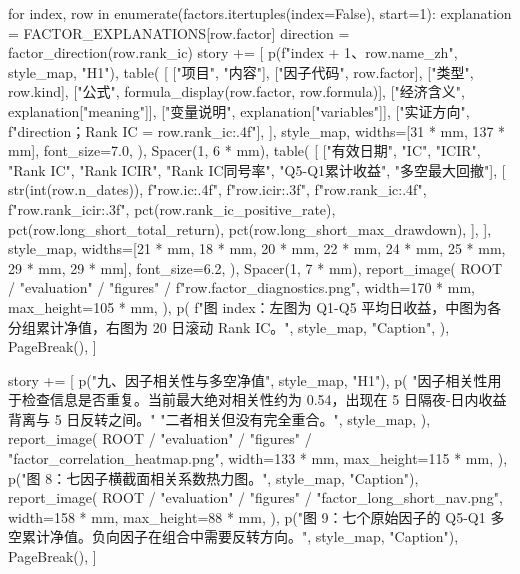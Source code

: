 \documentclass[UTF8,a4paper,fontset=fandol]{ctexart}
\begin{document}
\begin{ProjectCode}
    for index, row in enumerate(factors.itertuples(index=False), start=1):
        explanation = FACTOR_EXPLANATIONS[row.factor]
        direction = factor_direction(row.rank_ic)
        story += [
            p(f"{index + 1}、{row.name_zh}", style_map, "H1"),
            table(
                [
                    ["项目", "内容"],
                    ["因子代码", row.factor],
                    ["类型", row.kind],
                    ["公式", formula_display(row.factor, row.formula)],
                    ["经济含义", explanation["meaning"]],
                    ["变量说明", explanation["variables"]],
                    ["实证方向", f"{direction}；Rank IC = {row.rank_ic:.4f}"],
                ],
                style_map,
                widths=[31 * mm, 137 * mm],
                font_size=7.0,
            ),
            Spacer(1, 6 * mm),
            table(
                [
                    ["有效日期", "IC", "ICIR", "Rank IC", "Rank ICIR", "Rank IC同号率", "Q5-Q1累计收益", "多空最大回撤"],
                    [
                        str(int(row.n_dates)),
                        f"{row.ic:.4f}",
                        f"{row.icir:.3f}",
                        f"{row.rank_ic:.4f}",
                        f"{row.rank_icir:.3f}",
                        pct(row.rank_ic_positive_rate),
                        pct(row.long_short_total_return),
                        pct(row.long_short_max_drawdown),
                    ],
                ],
                style_map,
                widths=[21 * mm, 18 * mm, 20 * mm, 22 * mm, 24 * mm, 25 * mm, 29 * mm, 29 * mm],
                font_size=6.2,
            ),
            Spacer(1, 7 * mm),
            report_image(
                ROOT / "evaluation" / "figures" / f"{row.factor}_diagnostics.png",
                width=170 * mm,
                max_height=105 * mm,
            ),
            p(
                f"图 {index}：左图为 Q1-Q5 平均日收益，中图为各分组累计净值，右图为 20 日滚动 Rank IC。",
                style_map,
                "Caption",
            ),
            PageBreak(),
        ]

    story += [
        p("九、因子相关性与多空净值", style_map, "H1"),
        p(
            "因子相关性用于检查信息是否重复。当前最大绝对相关性约为 0.54，出现在 5 日隔夜-日内收益背离与 5 日反转之间。"
            "二者相关但没有完全重合。",
            style_map,
        ),
        report_image(
            ROOT / "evaluation" / "figures" / "factor_correlation_heatmap.png",
            width=133 * mm,
            max_height=115 * mm,
        ),
        p("图 8：七因子横截面相关系数热力图。", style_map, "Caption"),
        report_image(
            ROOT / "evaluation" / "figures" / "factor_long_short_nav.png",
            width=158 * mm,
            max_height=88 * mm,
        ),
        p("图 9：七个原始因子的 Q5-Q1 多空累计净值。负向因子在组合中需要反转方向。", style_map, "Caption"),
        PageBreak(),
    ]


\end{ProjectCode}
\end{document}
